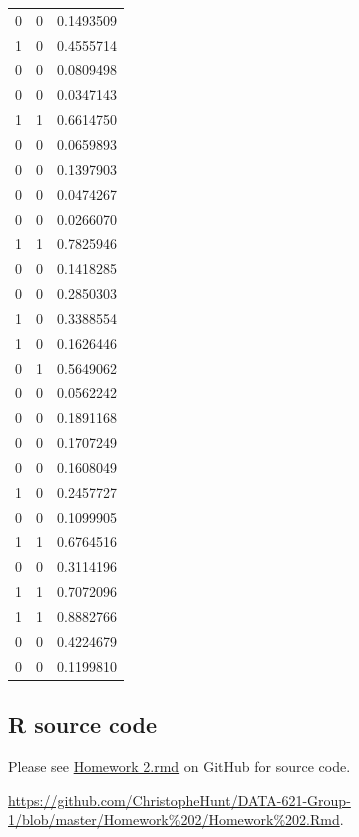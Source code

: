 \documentclass[]{article}
\begin{document}
\begin{longtable}[c]{@{}ccc@{}}
0 & 0 & 0.1493509\tabularnewline
1 & 0 & 0.4555714\tabularnewline
0 & 0 & 0.0809498\tabularnewline
0 & 0 & 0.0347143\tabularnewline
1 & 1 & 0.6614750\tabularnewline
0 & 0 & 0.0659893\tabularnewline
0 & 0 & 0.1397903\tabularnewline
0 & 0 & 0.0474267\tabularnewline
0 & 0 & 0.0266070\tabularnewline
1 & 1 & 0.7825946\tabularnewline
0 & 0 & 0.1418285\tabularnewline
0 & 0 & 0.2850303\tabularnewline
1 & 0 & 0.3388554\tabularnewline
1 & 0 & 0.1626446\tabularnewline
0 & 1 & 0.5649062\tabularnewline
0 & 0 & 0.0562242\tabularnewline
0 & 0 & 0.1891168\tabularnewline
0 & 0 & 0.1707249\tabularnewline
0 & 0 & 0.1608049\tabularnewline
1 & 0 & 0.2457727\tabularnewline
0 & 0 & 0.1099905\tabularnewline
1 & 1 & 0.6764516\tabularnewline
0 & 0 & 0.3114196\tabularnewline
1 & 1 & 0.7072096\tabularnewline
1 & 1 & 0.8882766\tabularnewline
0 & 0 & 0.4224679\tabularnewline
0 & 0 & 0.1199810\tabularnewline
\bottomrule
\end{longtable}

\subsection{R source code}\label{r-source-code}

Please see
\href{https://github.com/ChristopheHunt/DATA-621-Group-1/blob/master/Homework\%202/Homework\%202.Rmd}{Homework
2.rmd} on GitHub for source code.

\url{https://github.com/ChristopheHunt/DATA-621-Group-1/blob/master/Homework\%202/Homework\%202.Rmd}.
\end{document}
